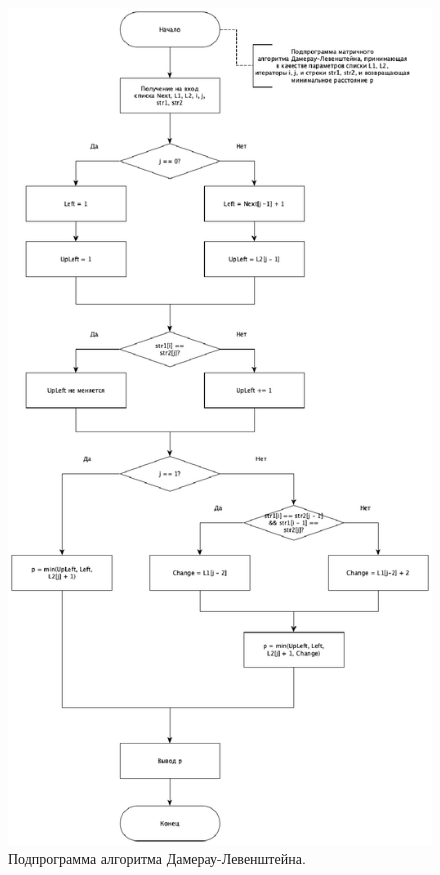 \documentclass[12pt]{report}
\begin{document}
\newpage

	\begin{figure}[h!]
		\centering
		\includegraphics[width=0.6\linewidth]{LevenDomerauM_sub}
		\caption{Подпрограмма алгоритма Дамерау-Левенштейна.}
		\label{ris:image7}
	\end{figure}

    
    
    
\end{document}
